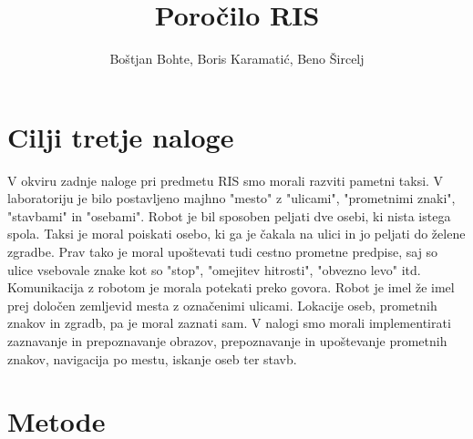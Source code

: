 \documentclass{llncs}
\begin{document}
\title{Poročilo RIS}
%
%
\author{Boštjan Bohte,  Boris Karamatić, Beno Šircelj}
%
%
%

\maketitle              %


%

\section{Cilji tretje naloge}
V okviru zadnje naloge pri predmetu RIS smo morali razviti pametni taksi. V laboratoriju je bilo postavljeno majhno "mesto" z "ulicami", "prometnimi znaki", "stavbami" in "osebami". Robot je bil sposoben peljati dve osebi, ki nista istega spola. Taksi je moral poiskati osebo, ki ga je čakala na ulici in jo peljati do želene zgradbe. Prav tako je moral upoštevati tudi cestno prometne predpise, saj so ulice vsebovale znake kot so "stop", "omejitev hitrosti", "obvezno levo" itd. Komunikacija z robotom je morala potekati preko govora. Robot je imel že imel prej določen zemljevid mesta z označenimi ulicami. Lokacije oseb, prometnih znakov in zgradb, pa je moral zaznati sam. V nalogi smo morali implementirati zaznavanje in prepoznavanje obrazov, prepoznavanje in upoštevanje prometnih znakov, navigacija po mestu, iskanje oseb ter stavb.




\section{Metode}
\end{document}
